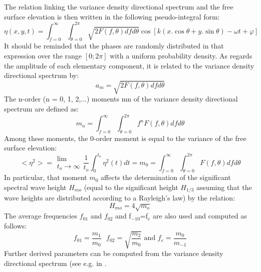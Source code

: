  The relation linking the variance density directional spectrum and the free surface elevation is then written in the following pseudo-integral form:
\begin{equation} \label{GrindEQ__2_9_}
\eta (x,y,t)=\int _{f=0}^{\infty }\int _{\theta =0}^{2\pi } \sqrt{2F(f,\theta )dfd\theta }  \cos \left[k\left(x.\cos \theta +y.\sin \theta \right)-\omega t+\varphi \right]
\end{equation}
It should be reminded that the phases are randomly distributed in that expression over the range $[0;2\pi]$ with a uniform probability density. As regards the amplitude of each elementary component, it is related to the variance density directional spectrum by:
\begin{equation} \label{GrindEQ__2_10_}
a_{m} =\sqrt{2F(f,\theta )dfd\theta }
\end{equation}
The n-order (n = 0, 1, 2,...) moments mn of the variance density directional spectrum are defined as:
\begin{equation} \label{GrindEQ__2_11_}
m_{n} =\int _{f=0}^{\infty }\int _{\theta =0}^{2\pi }  f^{n} F(f,\theta )dfd\theta
\end{equation}
Among these moments, the 0-order moment is equal to the variance of the free surface elevation:
\begin{equation} \label{GrindEQ__2_12_}
<\eta ^{2} >=\begin{array}{c} {\lim } \\ {t_{o} \to \infty } \end{array}\frac{1}{t_{o} } \int _{0}^{t_{o} }\eta ^{2} (t)dt =m_{0} =\int _{f=0}^{\infty }\int _{\theta =0}^{2\pi }  F(f,\theta )dfd\theta
\end{equation}
In particular, that moment $m_0$ affects the determination of the significant spectral wave height $H_{mo}$ (equal to the significant height $H_{1/3}$ assuming that the wave heights are distributed according to a Rayleigh's law) by the relation:
\begin{equation} \label{GrindEQ__2_13_}
H_{mo} =4\sqrt{m_{o} }
\end{equation}
The average frequencies $f_{01} $ and $f_{02} $ and f${}_{-10}$=f${}_{e}$ are also used and computed as follows:
\begin{equation} \label{GrindEQ__2_14_}
f_{01} =\frac{m_{1} }{m_{0} } \mbox{ }  f_{02} =\sqrt{\frac{m_{2} }{m_{0} } } \mbox{ and }  f_{e} =\frac{m_{0} }{m_{-1} }
\end{equation}
Further derived parameters can be computed from the variance density directional spectrum (see e.g. in \cite{Airh1986}.


